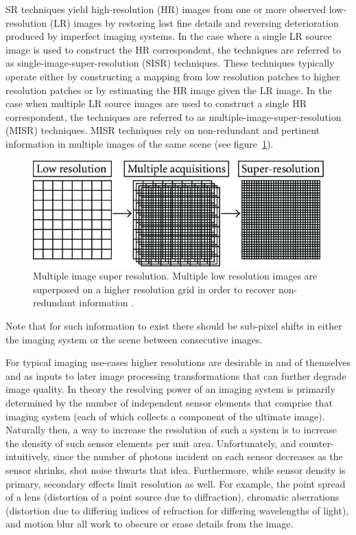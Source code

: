 SR techniques yield high-resolution (HR) images from one or more observed low-resolution (LR) images by restoring lost fine details and reversing deterioration produced by imperfect imaging systems.
%
In the case where a single LR source image is used to construct the HR correspondent, the techniques are referred to as single-image-super-resolution (SISR) techniques.
%
These techniques typically operate either by constructing a mapping from low resolution patches to higher resolution patches or by estimating the HR image given the LR image.
%
In the case when multiple LR source images are used to construct a single HR correspondent, the techniques are referred to as multiple-image-super-resolution (MISR) techniques.
%
MISR techniques rely on non-redundant and pertinent information in multiple images of the same scene (see figure~\ref{fig:misr}).
\begin{figure}[!htbp]
	\includegraphics[width=\linewidth,keepaspectratio]{figures/classical/misr.png}
	\caption{Multiple image super resolution. Multiple low resolution images are superposed on a higher resolution grid in order to recover non-redundant information \cite{misr}.}
	\label{fig:misr}
\end{figure}
%
Note that for such information to exist there should be sub-pixel shifts in either the imaging system or the scene between consecutive images.

For typical imaging use-cases higher resolutions are
desirable in and of themselves and as inputs to later image processing transformations that can further degrade image quality.
%
In theory the resolving power of an imaging system is primarily determined by the number of independent sensor elements that comprise that imaging system (each of which collects a component of the ultimate image).
%
Naturally then, a way to increase the resolution of such a system is to increase the density of such sensor elements per unit area.
%
Unfortunately, and counter-intuitively, since the number of photons incident on each sensor decreases as the sensor shrinks, shot noise thwarts that idea.
%
Furthermore, while sensor density is primary, secondary effects limit resolution as well.
%
For example, the point spread of a lens (distortion of a point source due to diffraction), chromatic aberrations (distortion due to differing indices of refraction for differing wavelengths of light), and motion blur all work to obscure or erase details from the image.


